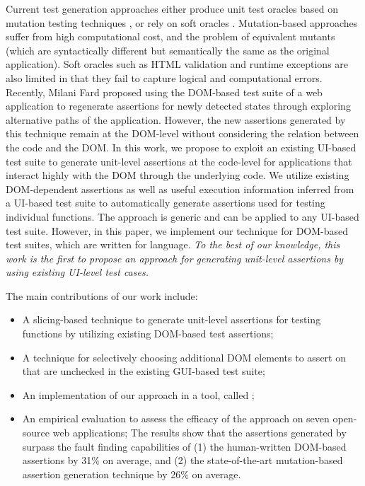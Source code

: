 Current test generation approaches either produce unit test oracles based on mutation testing techniques \cite{mirshokraie:icst15, fraser:tse12}, or rely on soft oracles \cite{artzi:icse11}. Mutation-based approaches suffer from high computational cost, and the problem of equivalent mutants (which are syntactically different but semantically the same as the original application).
Soft oracles such as HTML validation and runtime exceptions are also limited in that they fail to capture logical and computational errors. 
Recently, Milani Fard \etal \cite{milanifard:ase14} proposed using the DOM-based test suite of a web application to regenerate assertions for newly detected states through exploring alternative paths of the application. However, the new assertions generated by this technique remain at the DOM-level without considering the relation between the \javascript code and the DOM.
In this work, we propose to exploit an existing UI-based test suite to generate unit-level assertions at the code-level for applications that interact highly with the DOM through the underlying \javascript code. We utilize
existing DOM-dependent assertions as well as useful execution information inferred from a UI-based test suite to automatically generate assertions used for testing individual \javascript functions.
The approach is generic and can be applied to any UI-based test suite. However, in this paper, we implement our technique for DOM-based test suites, which are written for \javascript language.
{\em To the best of our knowledge, this work is the first to propose an approach for generating unit-level assertions by using existing UI-level test cases.} 

The main contributions of our work include:
\begin{itemize}[noitemsep]
\item A slicing-based technique to generate unit-level assertions for testing \javascript functions by utilizing existing DOM-based test assertions;
\item A technique for selectively choosing additional DOM elements to assert on that are unchecked in the existing GUI-based test suite;
\item An implementation of our approach in a tool, called \tool; 
\item An empirical evaluation to assess the efficacy of the approach on seven open-source web applications;
The results show that the assertions generated by \tool surpass the fault finding capabilities of (1) the human-written DOM-based assertions by 31\% on average, and (2) the state-of-the-art mutation-based assertion generation technique by 26\% on average.
\end{itemize} 